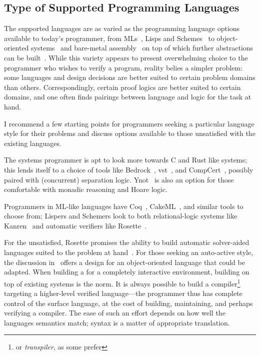 \subsection{Type of Supported Programming Languages}\label{S:t_pl}

The supported languages are as varied as the programming language options
available to today's programmer, from MLs~\cite{Coq,Kumar_2014}, Lisps and
Schemes~\cite{Torlak_2013} to object-oriented
systems~\cite{leino2008specification,leino2010dafny} and bare-metal
assembly~\cite{Chlipala_2011} on top of which further abstractions can be
built~\cite{Chlipala_2015}. While this variety appears to present overwhelming
choice to the programmer who wishes to verify a program, reality belies a
simpler problem: some languages and design decisions are better suited to
certain problem domains than others. Correspondingly, certain proof logics are
better suited to certain domains, and one often finds pairings between language
and logic for the task at hand.

I recommend a few starting points for programmers seeking a particular language
style for their problems and discuss options available to those unsatisfied with
the existing languages.

The systems programmer is apt to look more towards C and Rust like systems; this
lends itself to a choice of tools like Bedrock~\cite{Chlipala_2011},
\gls{vst}~\cite{VST}, and CompCert~\cite{Kastner-LBSSF-2017}, possibly paired
with (concurrent) separation logic. Ynot~\cite{Nanevski08ynot:reasoning} is also
an option for those comfortable with monadic reasoning and Hoare logic.

Programmers in ML-like languages have Coq~\cite{Coq}, CakeML~\cite{Kumar_2014},
and similar tools to choose from; Lispers and Schemers look to both
relational-logic systems like Kanren~\cite{Byrd_2009} and automatic verifiers
like Rosette~\cite{Rosette}.

For the unsatisfied, Rosette promises the ability to build automatic
solver-aided languages suited to the problem at hand~\cite{Torlak_2013}. For
those seeking an auto-active style, the discussion
in~\cite{leino2008specification} offers a design for an object-oriented language
that could be adapted. When building a for a completely interactive environment,
building on top of existing systems is the norm. It is always possible to build
a compiler\footnote{or \emph{transpiler}, as some prefer} targeting a
higher-level verified language---the programmer thus has complete control of the
surface language, at the cost of building, maintaining, and perhaps verifying a
compiler. The ease of such an effort depends on how well the languages semantics
match; syntax is a matter of appropriate translation.
